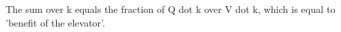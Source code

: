 The sum over k equals the fraction of Q dot k over V dot k, which is equal to 'benefit of the elevator'.
